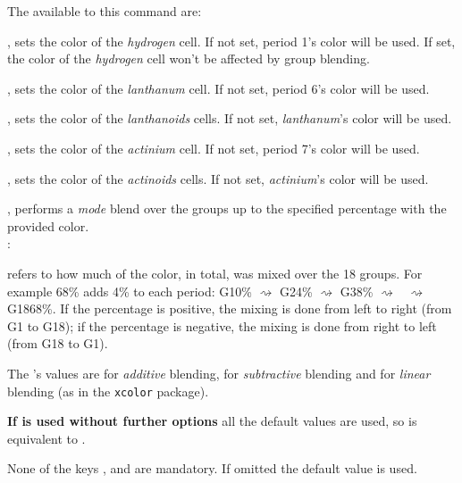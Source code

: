 \vspace{10pt}
The  available to this command are:
\vspace{4pt}
\begin{itemlist}
\item{}, sets the color of the \textit{hydrogen} cell. If not set, period 1's color will be used. If set, the color of the \textit{hydrogen} cell won't be affected by group blending.
\item{}, sets the color of the \textit{lanthanum} cell. If not set, period 6's color will be used.
\item{}, sets the color of the \textit{lanthanoids} cells. If not set, \textit{lanthanum}'s color will be used.
\item{}, sets the color of the \textit{actinium} cell. If not set, period 7's color will be used.
\item{}, sets the color of the \textit{actinoids} cells. If not set, \textit{actinium}'s color will be used.
\item{}, performs a \textit{mode} blend over the groups up to the specified percentage with the provided color.
\\ [3pt]:
\begin{itembar}
\item {} refers to how much of the color, in total, was mixed over the 18 groups. For example 68\% adds 4\% to each period: G1\raisebox{.8pt}{$\blacktriangleright$}0\% $\rightsquigarrow$ G2\raisebox{.8pt}{$\blacktriangleright$}4\% $\rightsquigarrow$ G3\raisebox{.8pt}{$\blacktriangleright$}8\% $\rightsquigarrow$ \myldots\ $\rightsquigarrow$ G18\raisebox{.8pt}{$\blacktriangleright$}68\%. If the percentage is positive, the mixing is done from left to right (from G1 to G18); if the percentage is negative, the mixing is done from right to left (from G18 to G1).
\item The 's values are  for \textit{additive} blending,  for \textit{subtractive} blending and  for \textit{linear} blending (as in the \texttt{\small xcolor} package).
\item \textbf{If  is used without further options} all the default values are used, so  is equivalent to .
\item None of the keys ,  and  are mandatory. If omitted the default value is used.
\end{itembar}
\end{itemlist}
